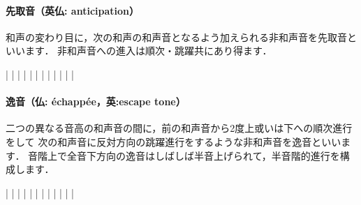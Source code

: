 \documentclass[dvipdfmx,uplatex,b5paper,openany,jbase=12Q,nomag*,textwidth-limit=44%
               ]{gachimuchi}[2020/05/05]
\begin{document}
\paragraph{先取音（英仏: anticipation）}
和声の変わり目に，次の和声の和声音となるよう加えられる非和声音を先取音といいます．
非和声音への進入は順次・跳躍共にあり得ます．
\begin{Music}
  \generalmeter{\meterC}%
  \Startpiece%
  \NOtes%
  |\zchordsu{\Cross}%
  \en\NOTes%
  |%
  \en\doublebar%
  \NOtes%
  |\zchordsu{\Cross}%
  \en\NOTes%
  |%
  \en\doublebar%
  \NOtes%
  |\zchordsu{\Cross}%
  \en\NOTes%
  |%
  \en\doublebar%
  \NOtes%
  |\zchordsu{\Cross}%
  \en\NOTes%
  |%
  \en\doublebar%
  \NOtes%
  |\zchordsu{\Cross}%
  \en\NOTes%
  |%
  \en\doublebar%
  \NOtes%
  |\zchordsu{\Cross}%
  \en\NOTes%
  |%
  \en\setdoublebar%
  \endpiece%
\end{Music}
\paragraph{逸音（仏: échappée，英:escape tone）}
二つの異なる音高の和声音の間に，前の和声音から2度上或いは下への順次進行をして
次の和声音に反対方向の跳躍進行をするような非和声音を逸音といいます．
音階上で全音下方向の逸音はしばしば半音上げられて，半音階的進行を構成します．
\begin{Music}
  \generalmeter{\meterC}%
  \Startpiece%
  \NOtes%
  |\zchordsu{\Cross}%
  \en\NOTes%
  |%
  \en\doublebar%
  \NOtes%
  |\zchordsu{\Cross}%
  \en\NOTes%
  |%
  \en\doublebar%
  \NOtes%
  |\zchordsu{\Cross}%
  \en\NOTes%
  |%
  \en\doublebar%
  \NOtes%
  |\zchordsu{\Cross}%
  \en\NOTes%
  |%
  \en\doublebar%
  \NOtes%
  |\zchordsu{\Cross}%
  \en\NOTes%
  |%
  \en\doublebar%
  \NOtes%
  |\zchordsu{\Cross}%
  \en\NOTes%
  |%
  \en\setdoublebar%
  \endpiece%
\end{Music}
\end{document}
